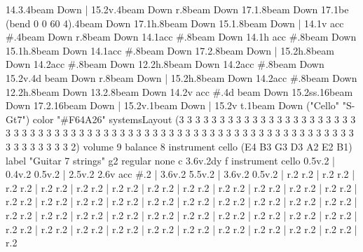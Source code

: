       14.3.4{beam Down}
    |
      15.2{v}.4{beam Down}
      r.8{beam Down}
      17.1.8{beam Down}
      17.1{be (bend 0 0 60 4)}.4{beam Down}
      17.1{h}.8{beam Down}
      15.1.8{beam Down}
    |
      14.1{v acc #}.4{beam Down}
      r.8{beam Down}
      14.1{acc #}.8{beam Down}
      14.1{h acc #}.8{beam Down}
      15.1{h}.8{beam Down}
      14.1{acc #}.8{beam Down}
      17.2.8{beam Down}
    |
      15.2{h}.8{beam Down}
      14.2{acc #}.8{beam Down}
      12.2{h}.8{beam Down}
      14.2{acc #}.8{beam Down}
      15.2{v}.4{d beam Down}
      r.8{beam Down}
    |
      15.2{h}.8{beam Down}
      14.2{acc #}.8{beam Down}
      12.2{h}.8{beam Down}
      13.2.8{beam Down}
      14.2{v acc #}.4{d beam Down}
      15.2{ss}.16{beam Down}
      17.2.16{beam Down}
    |
      15.2{v}.1{beam Down}
    |
      15.2{v t}.1{beam Down}
\track ("Cello" "S-Gt7") {
  color "#F64A26"
  systemsLayout (3 3 3 3 3 3 3 3 3 3 3 3 3 3 3 3 3 3 3 3 3 3 3 3 3 3 3 3 3 3 3 3 3 3 3 3 3 3 3 3 3 3 3 3 3 3 3 3 3 3 3 3 3 3 3 3 3 3 3 3 3 3 3 3 3 3 3 3 3 3 3 3 3 2)
  volume 9
  balance 8
  instrument cello
}
    \tuning (E4 B3 G3 D3 A2 E2 B1) {
      label "Guitar 7 strings"
    }
    \clef g2
    \ottava regular
    \simile none
    \ks c
      3.6{v}.2{dy f instrument cello}
      0.5{v}.2
    |
      0.4{v}.2
      0.5{v}.2
    |
      2.5{v}.2
      2.6{v acc #}.2
    |
      3.6{v}.2
      5.5{v}.2
    |
      3.6{v}.2
      0.5{v}.2
    |
      r.2
      r.2
    |
      r.2
      r.2
    |
      r.2
      r.2
    |
      r.2
      r.2
    |
      r.2
      r.2
    |
      r.2
      r.2
    |
      r.2
      r.2
    |
      r.2
      r.2
    |
      r.2
      r.2
    |
      r.2
      r.2
    |
      r.2
      r.2
    |
      r.2
      r.2
    |
      r.2
      r.2
    |
      r.2
      r.2
    |
      r.2
      r.2
    |
      r.2
      r.2
    |
      r.2
      r.2
    |
      r.2
      r.2
    |
      r.2
      r.2
    |
      r.2
      r.2
    |
      r.2
      r.2
    |
      r.2
      r.2
    |
      r.2
      r.2
    |
      r.2
      r.2
    |
      r.2
      r.2
    |
      r.2
      r.2
    |
      r.2
      r.2
    |
      r.2
      r.2
    |
      r.2
      r.2
    |
      r.2
      r.2
    |
      r.2
      r.2
    |
      r.2
      r.2
    |
      r.2
      r.2
    |
      r.2
      r.2
    |
      r.2
      r.2
    |
      r.2
      r.2
    |
      r.2
      r.2
    |
      r.2
      r.2
    |
      r.2
      r.2
    |
      r.2
      r.2
    |
      r.2
      r.2
    |
      r.2
      r.2
    |
      r.2

